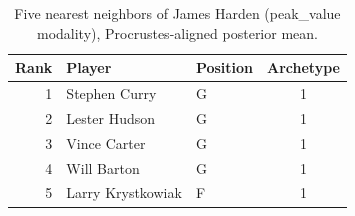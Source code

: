 \begin{table}[htbp]
  \centering\small
  \begin{tabular}{rllc}
    \toprule
    Rank & Player & Position & Archetype \\
    \midrule
    1 & Stephen Curry & G & 1 \\
    2 & Lester Hudson & G & 1 \\
    3 & Vince Carter & G & 1 \\
    4 & Will Barton & G & 1 \\
    5 & Larry Krystkowiak & F & 1 \\
    \bottomrule
  \end{tabular}
  \caption{Five nearest neighbors of James Harden (peak_value modality), Procrustes-aligned posterior mean.}
  \label{tab:James_Harden_neighbors_peak_value}
\end{table}

